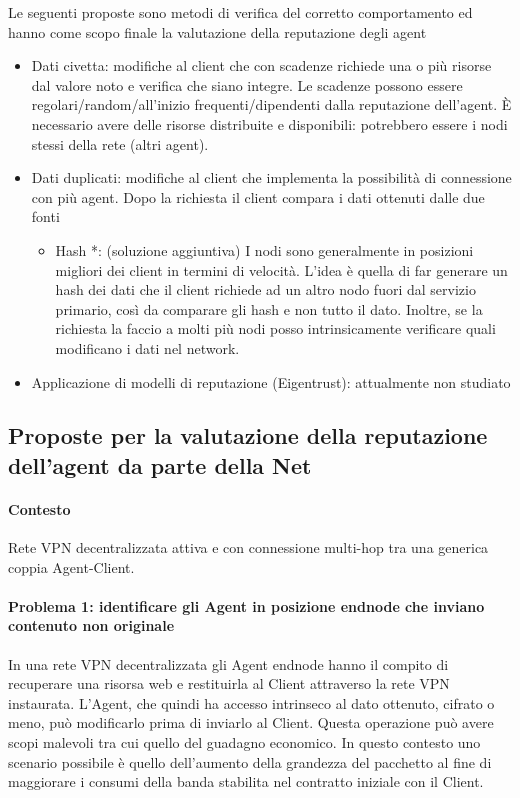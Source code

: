 \documentclass[]{article}
\begin{document}
	Le seguenti proposte sono metodi di verifica del corretto comportamento ed hanno come scopo finale la valutazione della reputazione degli agent
	\begin{itemize}
		\item Dati civetta: modifiche al client che con scadenze richiede una o più risorse dal valore noto e verifica che siano integre. Le scadenze possono essere regolari/random/all’inizio frequenti/dipendenti dalla reputazione dell’agent. È necessario avere delle risorse distribuite e disponibili: potrebbero essere i nodi stessi della rete (altri agent).
		\item Dati duplicati: modifiche al client che implementa la possibilità di connessione con più agent. Dopo la richiesta il client compara i dati ottenuti dalle due fonti
		\begin{itemize}
			\item Hash *: (soluzione aggiuntiva) I nodi sono generalmente in posizioni migliori dei client in termini di velocità. L’idea è quella di far generare un hash dei dati che il client richiede ad un altro nodo fuori dal servizio primario, così da comparare gli hash e non tutto il dato.
			Inoltre, se la richiesta la faccio a molti più nodi posso intrinsicamente verificare quali modificano i dati nel network.
		\end{itemize}
		\item Applicazione di modelli di reputazione (Eigentrust): attualmente non studiato
	\end{itemize}

	\pagebreak

	\subsection{Proposte per la valutazione della reputazione dell'agent da parte della Net}
		\paragraph{Contesto}
			Rete VPN decentralizzata attiva e con connessione multi-hop tra una generica coppia Agent-Client.
			
		\paragraph{Problema 1: identificare gli Agent in posizione endnode che inviano contenuto non originale}
			In una rete VPN decentralizzata gli Agent endnode hanno il compito di recuperare una risorsa web e restituirla al Client attraverso la rete VPN instaurata. L'Agent, che quindi ha accesso intrinseco al dato ottenuto, cifrato o meno, può modificarlo prima di inviarlo al Client. Questa operazione può avere scopi malevoli tra cui quello del guadagno economico. In questo contesto uno scenario possibile è quello dell'aumento della grandezza del pacchetto al fine di maggiorare i consumi della banda stabilita nel contratto iniziale con il Client.
		 	
\end{document}
